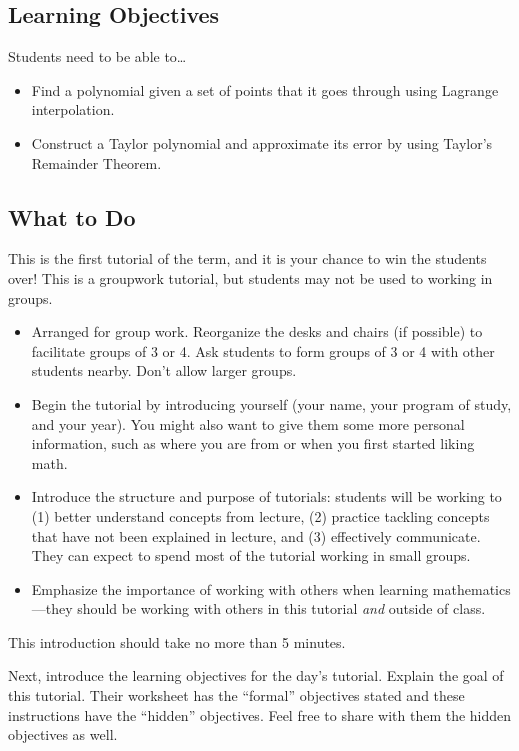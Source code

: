 		\subsection*{Learning Objectives} Students need to be able to\ldots
		\begin{itemize}
			\item Find a polynomial given a set of points that it goes through using Lagrange interpolation.
			\item Construct a Taylor polynomial and approximate its error by using Taylor's Remainder Theorem.
		\end{itemize}

		\subsection*{What to Do} This is the first tutorial of the term, and
		it is your chance to win the students over! This is a groupwork tutorial,
		but students may not be used to working in groups.

		\begin{itemize}
			\item Arranged for group work. Reorganize the desks and chairs
				(if possible) to facilitate groups of 3 or 4. Ask
				students to form groups of 3 or 4 with other students
				nearby. Don't allow larger groups.

			\item Begin the tutorial by introducing yourself (your name,
				your program of study, and your year). You might
				also want to give them some more personal information,
				such as where you are from or when you first started liking math.

			\item Introduce the structure and purpose of tutorials: students
				will be working to (1) better understand concepts
				from lecture, (2) practice tackling concepts that
				have not been explained in lecture, and (3) effectively
				communicate. They can expect to spend most of the
				tutorial working in small groups.

			\item Emphasize the importance of working with others when
				learning mathematics---they should be working with
				others in this tutorial \emph{and} outside of
				class.
		\end{itemize}

		This introduction should take no more than 5 minutes.

		Next, introduce the learning objectives for the day's tutorial. Explain the goal of this tutorial. Their worksheet has the ``formal'' objectives stated and these instructions have the ``hidden'' objectives. Feel free to share with them the hidden objectives as well.

